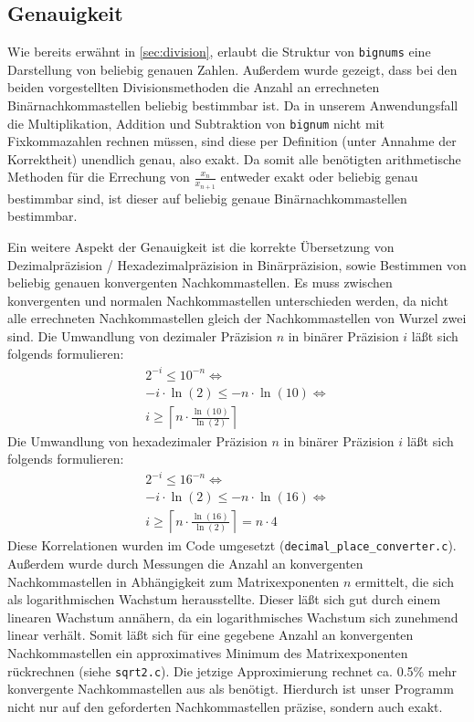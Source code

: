 \documentclass[course=erap]{aspdoc}
\begin{document}
\subsection{Genauigkeit}
Wie bereits erwähnt in \ref{sec:division}, erlaubt die Struktur von \texttt{bignums} eine Darstellung von beliebig genauen Zahlen. Außerdem wurde gezeigt, dass bei den beiden vorgestellten Divisionsmethoden die Anzahl an errechneten Binärnachkommastellen beliebig bestimmbar ist. Da in unserem Anwendungsfall die Multiplikation, Addition und Subtraktion von \texttt{bignum} nicht mit Fixkommazahlen rechnen müssen, sind diese per Definition (unter Annahme der Korrektheit) unendlich genau, also exakt. Da somit alle benötigten arithmetische Methoden für die Errechung von $\frac{x_n}{x_{n+1}}$ entweder exakt oder beliebig genau bestimmbar sind, ist dieser auf beliebig genaue Binärnachkommastellen bestimmbar.

Ein weitere Aspekt der Genauigkeit ist die korrekte Übersetzung von Dezimalpräzision / Hexadezimalpräzision in Binärpräzision, sowie Bestimmen von beliebig genauen konvergenten Nachkommastellen. Es muss zwischen konvergenten und normalen Nachkommastellen unterschieden werden, da nicht alle errechneten Nachkommastellen gleich der Nachkommastellen von Wurzel zwei sind.
Die Umwandlung von dezimaler Präzision $n$ in binärer Präzision $i$ läßt sich folgends formulieren:
\begin{align}
  2^{-i} \leq 10^{-n} \Leftrightarrow \nonumber \\
    -i \cdot \ln(2) \leq -n \cdot \ln(10) \Leftrightarrow \nonumber \\
  i \geq \left\lceil n \cdot \frac{\ln(10)}{\ln(2)} \right\rceil \nonumber
\end{align} 
Die Umwandlung von hexadezimaler Präzision $n$ in binärer Präzision $i$ läßt sich folgends formulieren:
\begin{align}
  2^{-i} \leq 16^{-n} \Leftrightarrow \nonumber \\
    -i \cdot \ln(2) \leq -n \cdot \ln(16) \Leftrightarrow \nonumber \\
  i \geq \left\lceil n \cdot \frac{\ln(16)}{\ln(2)}\right\rceil = n \cdot 4 \nonumber
\end{align}
Diese Korrelationen wurden im Code umgesetzt (\texttt{decimal\_place\_converter.c}).
Außerdem wurde durch Messungen die Anzahl an konvergenten Nachkommastellen in Abhängigkeit zum Matrixexponenten $n$ ermittelt, die sich als logarithmischen Wachstum herausstellte. Dieser läßt sich gut durch einem linearen Wachstum annähern, da ein logarithmisches Wachstum sich zunehmend linear verhält. Somit läßt sich für eine gegebene Anzahl an konvergenten Nachkommastellen ein approximatives Minimum des Matrixexponenten rückrechnen (siehe \texttt{sqrt2.c}). Die jetzige Approximierung rechnet ca. 0.5\% mehr konvergente Nachkommastellen aus als benötigt. Hierdurch ist unser Programm nicht nur auf den geforderten Nachkommastellen präzise, sondern auch exakt.
\end{document}
